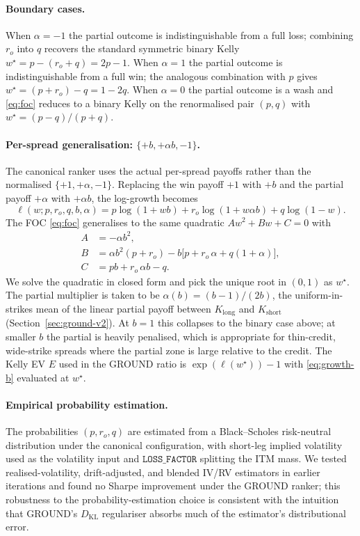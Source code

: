 \documentclass[11pt]{article}
\begin{document}
\paragraph{Boundary cases.}
When $\alpha = -1$ the partial outcome is indistinguishable from a full
loss; combining $r_o$ into $q$ recovers the standard symmetric binary
Kelly $w^\star = p - (r_o + q) = 2p - 1$. When $\alpha = 1$ the partial
outcome is indistinguishable from a full win; the analogous combination
with $p$ gives $w^\star = (p + r_o) - q = 1 - 2q$. When $\alpha = 0$ the
partial outcome is a wash and \eqref{eq:foc} reduces to a binary Kelly
on the renormalised pair $(p, q)$ with $w^\star = (p - q) / (p + q)$.

\paragraph{Per-spread generalisation: $\{+b, +\alpha b, -1\}$.}
The canonical ranker uses the actual per-spread payoffs rather than the
normalised $\{+1, +\alpha, -1\}$. Replacing the win payoff $+1$ with $+b$
and the partial payoff $+\alpha$ with $+\alpha b$, the log-growth
becomes
\begin{equation}
\ell(w; p, r_o, q, b, \alpha)
  = p \log(1 + w b) + r_o \log(1 + w\alpha b) + q \log(1 - w).
\label{eq:growth-b}
\end{equation}
The FOC \eqref{eq:foc} generalises to the same quadratic
$A w^2 + B w + C = 0$ with
\begin{align*}
A &= -\alpha b^2, \\
B &= \alpha b^2 (p + r_o) - b\bigl[p + r_o\,\alpha + q(1 + \alpha)\bigr], \\
C &= p b + r_o\, \alpha b - q.
\end{align*}
We solve the quadratic in closed form and pick the unique root in
$(0, 1)$ as $w^\star$. The partial multiplier is taken to be
$\alpha(b) = (b-1)/(2b)$, the uniform-in-strikes mean of the linear
partial payoff between $K_{\text{long}}$ and $K_{\text{short}}$
(Section~\ref{sec:ground-v2}). At $b = 1$ this collapses to the
binary case above; at smaller $b$ the partial is heavily penalised,
which is appropriate for thin-credit, wide-strike spreads where the
partial zone is large relative to the credit. The Kelly EV $E$ used in
the GROUND ratio is $\exp(\ell(w^\star)) - 1$ with \eqref{eq:growth-b}
evaluated at $w^\star$.

\paragraph{Empirical probability estimation.}
The probabilities $(p, r_o, q)$ are estimated from a Black--Scholes
risk-neutral distribution under the canonical configuration, with
short-leg implied volatility used as the volatility input and
$\texttt{LOSS\_FACTOR}$ splitting the ITM mass. We tested
realised-volatility, drift-adjusted, and blended IV/RV estimators in
earlier iterations and found no Sharpe improvement under the GROUND
ranker; this robustness to the probability-estimation choice is
consistent with the intuition that GROUND's $D_{\mathrm{KL}}$ regulariser
absorbs much of the estimator's distributional error.
\end{document}
